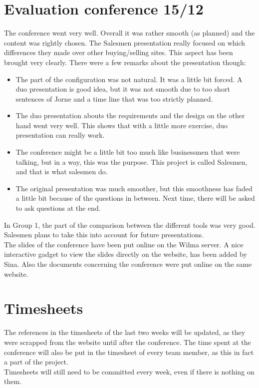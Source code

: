 \documentclass[a4paper, 12pt]{article}
\begin{document}
	\section{Evaluation conference 15/12}
	The conference went very well. Overall it was rather smooth (as planned) and the content was rightly chosen. The Salesmen presentation really focused on which differences they made over other buying/selling sites. This aspect has been brought very clearly. There were a few remarks about the presentation though:
		\begin{itemize}
			\item The part of the configuration was not natural. It was a little bit forced. A duo presentation is good idea, but it was not smooth due to too short sentences of Jorne and a time line that was too strictly planned.
			\item The duo presentation abouts the requirements and the design on the other hand went very well. This shows that with a little more exercise, duo presentation can really work.
			\item The conference might be a little bit too much like businessmen that were talking, but in a way, this was the purpose. This project is called Salesmen, and that is what salesmen do.
			\item The original presentation was much smoother, but this smoothness has faded a little bit because of the questions in between. Next time, there will be asked to ask questions at the end.
		\end{itemize}
		
In Group 1, the part of the comparison between the different tools was very good. Salesmen plans to take this into account for future presentations.\\
The slides of the conference have been put online on the Wilma server. \cite{site1} A nice interactive gadget to view the slides directly on the website, has been added by Sina. Also the documents concerning the conference were put online on the same website.

	\section{Timesheets}
The references in the timesheets of the last two weeks will be updated, as they were scrapped from the website until after the conference. The time spent at the conference will also be put in the timesheet of every team member, as this in fact a part of the project. \\
Timesheets will still need to be committed every week, even if there is nothing on them.
\end{document}
